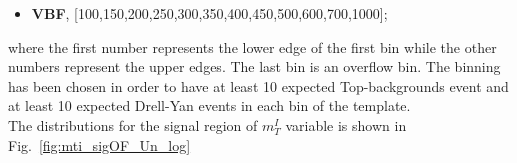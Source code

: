 \begin{itemize}
\item {\bf VBF}, [100,150,200,250,300,350,400,450,500,600,700,1000];
\end{itemize}
where the first number represents the lower edge of the first bin while the other numbers represent the upper edges. The last bin is an overflow bin. 
The binning has been chosen in order to have at least 10 expected Top-backgrounds event and at least 10  expected  Drell-Yan events in each bin of the template.\\
The distributions for the signal region of $m_T^I$ variable is shown in  Fig.~\ref{fig:mti_sigOF_Un_log} 
\begin{figure}[htbp]
\centering
{}
\\
\end{figure}
